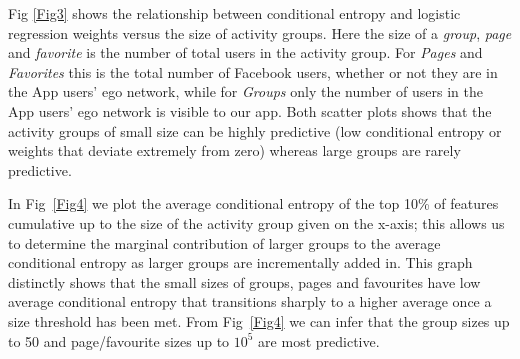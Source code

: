




Fig \ref{Fig3} shows the relationship between conditional
    entropy and logistic regression weights versus the size of activity
    groups. Here the size of a {\em group}, {\em page} and {\em favorite} 
    is the number of total users in the activity group. 
    For {\em Pages} and {\em Favorites} this is the total number of Facebook users, 
    whether or not they are in the App users' ego network, while for 
    {\em Groups} only the number of users in the App users' ego network is visible to our app.
    Both scatter plots shows that the activity groups of small size can be
    highly predictive (low conditional entropy or weights that deviate
    extremely from zero) whereas large groups are rarely predictive.

In Fig~\ref{Fig4} we plot the average conditional entropy of the top
    10\% of features cumulative up to the size of the activity group given on the
    x-axis; this allows us to determine the marginal contribution of
    larger groups to the average conditional entropy as larger groups
    are incrementally added in.  This graph 
    distinctly shows that the small sizes of groups, pages and favourites
    have low average conditional entropy that transitions sharply to a
    higher average once a size threshold has been met.  From 
    Fig~\ref{Fig4} we can infer that the group sizes up to 50 and
    page/favourite sizes up to $10^{5}$ are most predictive.



   
